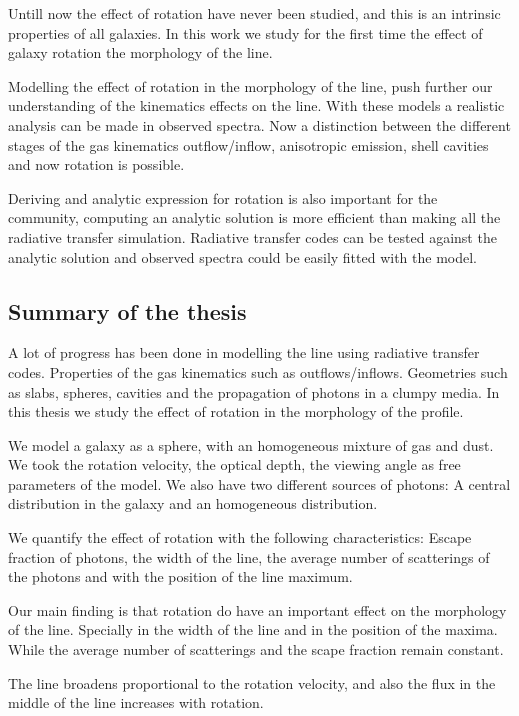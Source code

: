 Untill now the effect of rotation have never been studied, and this is 
an intrinsic properties of all galaxies. In this work we study for the 
first time the effect of galaxy rotation the morphology of the \ly line.

Modelling the effect of rotation in the morphology of the \ly line, push
further our understanding of the kinematics effects on the \ly line. 
With these models a realistic analysis can be made in observed \ly spectra. 
Now a distinction between the different stages of the gas kinematics
 outflow/inflow, anisotropic \ly emission, shell cavities and now
 rotation is possible.

Deriving and analytic expression for rotation is also important for
the community, computing an analytic solution is more efficient than
making all the radiative transfer simulation. Radiative transfer codes
can be tested against the analytic solution and observed spectra could
be easily fitted  with the model. 

\subsection{Summary of the thesis}

A lot of progress has been done in modelling the \ly line using radiative
transfer codes. Properties of the gas kinematics such as outflows/inflows. 
Geometries such as slabs, spheres, cavities and the propagation of \ly photons
in a clumpy media. In this thesis we study the effect 
of rotation in the morphology of the \ly profile.  

We model a galaxy as a sphere, with an homogeneous mixture of gas and dust. 
We took the rotation velocity, the optical depth, the viewing angle as free
parameters of the model. We also have two different sources of \ly photons:
A central distribution in the galaxy and an homogeneous distribution. 

We quantify the effect of rotation with the following characteristics: 
Escape fraction of \ly photons, the width of the \ly line, the average number
of scatterings of the \ly photons and with the position of the \ly line maximum.

Our main finding is that rotation do have an important effect on the morphology 
of the \ly line. Specially in the width of the line and in the position of the 
maxima. While the average number of scatterings  and the scape
fraction remain constant.

The line broadens proportional to the rotation velocity, and also the flux in 
the middle of the line increases with rotation.

